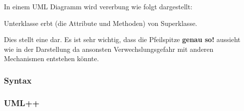 In einem UML Diagramm wird vererbung wie folgt dargestellt:\\
\noindent
\begin{minipage}{0.6\columnwidth}
\begin{center}
\end{center}
\end{minipage}
\begin{minipage}{0.4\columnwidth}

Unterklasse erbt (die Attribute und Methoden) von Superklasse. 

\end{minipage}

Dies stellt eine  dar. 
Es ist sehr wichtig, dass die Pfeilspitze \colorbox{red!65}{\textbf{genau so!}} aussieht wie in der Darstellung da ansonsten Verwechslungsgefahr mit anderen Mechanismen entstehen könnte.

\subsubsection{Syntax}



\subsubsection{UML++}

